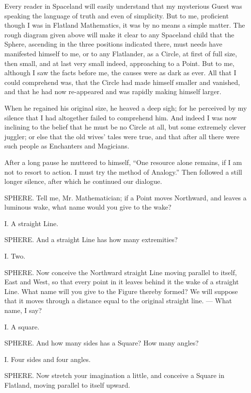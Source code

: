 \documentclass[12pt, a4paper, twoside]{memoir}
\begin{document}
Every reader in Spaceland will easily understand that my mysterious Guest was
speaking the language of truth and even of simplicity. But to me, proficient
though I was in Flatland Mathematics, it was by no means a simple matter. The
rough diagram given above will make it clear to any Spaceland child that the
Sphere, ascending in the three positions indicated there, must needs have
manifested himself to me, or to any Flatlander, as a Circle, at first of full
size, then small, and at last very small indeed, approaching to a Point. But
to me, although I saw the facts before me, the causes were as dark as ever.
All that I could comprehend was, that the Circle had made himself smaller and
vanished, and that he had now re-appeared and was rapidly making himself
larger.

When he regained his original size, he heaved a deep sigh; for he perceived by
my silence that I had altogether failed to comprehend him. And indeed I was
now inclining to the belief that he must be no Circle at all, but some
extremely clever juggler; or else that the old wives' tales were true, and
that after all there were such people as Enchanters and Magicians.

After a long pause he muttered to himself, ``One resource alone remains, if I
am not to resort to action. I must try the method of Analogy.'' Then followed a
still longer silence, after which he continued our dialogue.

SPHERE. Tell me, Mr. Mathematician; if a Point moves Northward, and leaves a
luminous wake, what name would you give to the wake?

I. A straight Line.

SPHERE. And a straight Line has how many extremities?

I. Two.

SPHERE. Now conceive the Northward straight Line moving parallel to itself,
East and West, so that every point in it leaves behind it the wake of a
straight Line. What name will you give to the Figure thereby formed? We will
suppose that it moves through a distance equal to the original straight line.
--- What name, I say?

I. A square.

SPHERE. And how many sides has a Square? How many angles?

I. Four sides and four angles.

SPHERE. Now stretch your imagination a little, and conceive a Square in
Flatland, moving parallel to itself upward.
\end{document}
